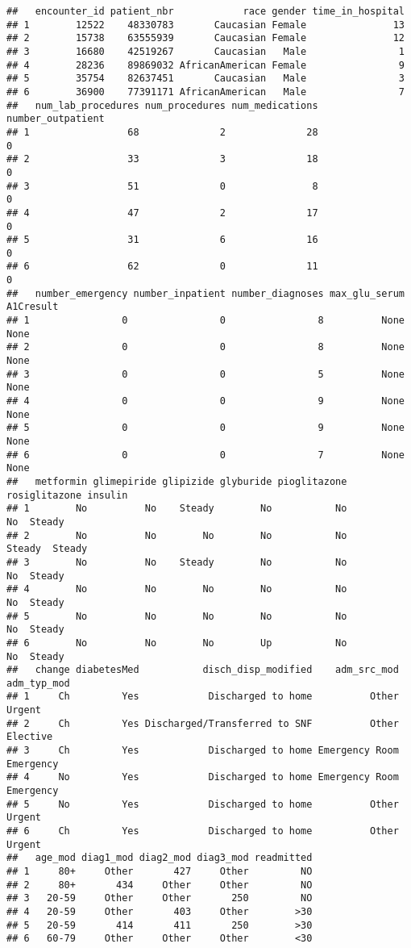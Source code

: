 \documentclass[
]{article}
\begin{document}
\begin{verbatim}
##   encounter_id patient_nbr            race gender time_in_hospital
## 1        12522    48330783       Caucasian Female               13
## 2        15738    63555939       Caucasian Female               12
## 3        16680    42519267       Caucasian   Male                1
## 4        28236    89869032 AfricanAmerican Female                9
## 5        35754    82637451       Caucasian   Male                3
## 6        36900    77391171 AfricanAmerican   Male                7
##   num_lab_procedures num_procedures num_medications number_outpatient
## 1                 68              2              28                 0
## 2                 33              3              18                 0
## 3                 51              0               8                 0
## 4                 47              2              17                 0
## 5                 31              6              16                 0
## 6                 62              0              11                 0
##   number_emergency number_inpatient number_diagnoses max_glu_serum A1Cresult
## 1                0                0                8          None      None
## 2                0                0                8          None      None
## 3                0                0                5          None      None
## 4                0                0                9          None      None
## 5                0                0                9          None      None
## 6                0                0                7          None      None
##   metformin glimepiride glipizide glyburide pioglitazone rosiglitazone insulin
## 1        No          No    Steady        No           No            No  Steady
## 2        No          No        No        No           No        Steady  Steady
## 3        No          No    Steady        No           No            No  Steady
## 4        No          No        No        No           No            No  Steady
## 5        No          No        No        No           No            No  Steady
## 6        No          No        No        Up           No            No  Steady
##   change diabetesMed           disch_disp_modified    adm_src_mod adm_typ_mod
## 1     Ch         Yes            Discharged to home          Other      Urgent
## 2     Ch         Yes Discharged/Transferred to SNF          Other    Elective
## 3     Ch         Yes            Discharged to home Emergency Room   Emergency
## 4     No         Yes            Discharged to home Emergency Room   Emergency
## 5     No         Yes            Discharged to home          Other      Urgent
## 6     Ch         Yes            Discharged to home          Other      Urgent
##   age_mod diag1_mod diag2_mod diag3_mod readmitted
## 1     80+     Other       427     Other         NO
## 2     80+       434     Other     Other         NO
## 3   20-59     Other     Other       250         NO
## 4   20-59     Other       403     Other        >30
## 5   20-59       414       411       250        >30
## 6   60-79     Other     Other     Other        <30
\end{verbatim}
\end{document}
